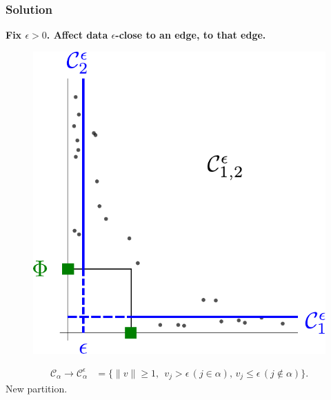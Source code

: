 \documentclass[9pt]{beamer}
\begin{document}
\begin{frame}
\frametitle{Solution}
 \textbf{Fix $\epsilon>0$. Affect data  $\epsilon$-close to an edge,
   to that edge. }

\begin{figure}[h]
  \centering
  \includegraphics[scale=0.4]{sourcefigs/representation2Drect.pdf}
\end{figure}

\begin{align*}
\mathcal{C}_\alpha\to \mathcal{C}_\alpha^\epsilon &= \{\|v\|\ge 1,~~ v_j>\epsilon\, (j\in\alpha),\,v_j \le \epsilon \,(j\notin\alpha) \}. 
\end{align*}
New partition. %
\end{frame}
\end{document}
